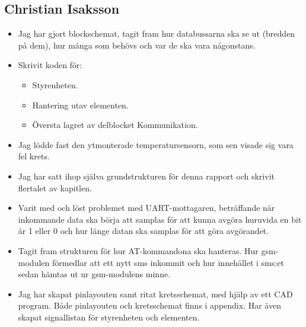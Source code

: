 \documentclass[a4paper]{scrartcl}
\begin{document}
\subsection{Christian Isaksson}
\begin{itemize}
\item Jag har gjort blockschemat, tagit fram hur databussarna ska se ut (bredden på dem), hur många som behövs och var de ska vara någonstans.
\item Skrivit koden för:
	\begin{itemize}
	\item Styrenheten.
	\item Hantering utav elementen.
	\item Översta lagret av delblocket Kommunikation.
	\end{itemize}
\item Jag lödde fast den ytmonterade temperatursensorn, som sen visade sig vara fel krets.
\item Jag har satt ihop själva grundstrukturen för denna rapport och skrivit flertalet av kapitlen.
\item Varit med och löst problemet med UART-mottagaren, beträffande när inkommande data ska börja att samplas för att kunna avgöra huruvida en bit är 1 eller 0  och hur länge datan ska samplas för att göra avgörandet.
\item Tagit fram strukturen för hur AT-kommandona ska hanteras. Hur gsm-modulen förmedlar att ett nytt sms inkommit och hur innehållet i sms:et sedan hämtas ut ur gsm-modulens minne.
\item Jag har skapat pinlayouten samt ritat kretsschemat, med hjälp av ett CAD program. Både pinlayouten och kretsschemat finns i appendix. Har även skapat signallistan för styrenheten och elementen.
\end{itemize}
\end{document}
